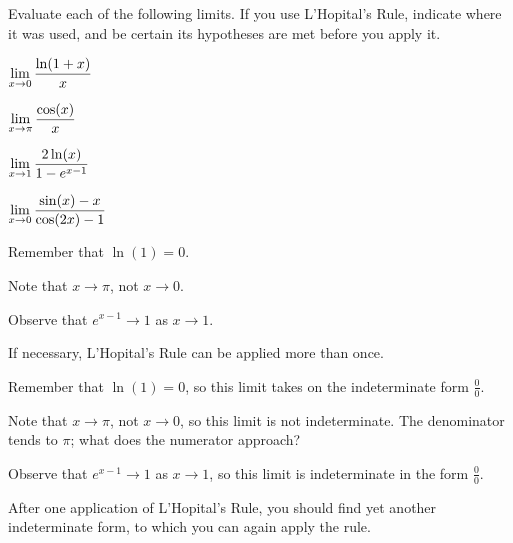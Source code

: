 \begin{activity} \label{A:3.7.1}  
Evaluate each of the following limits.  If you use L'Hopital's Rule, indicate where it was used, and be certain its hypotheses are met before you apply it.
\ba
\item $\displaystyle \lim_{x \to 0} \frac{\ln(1 + x)}{x}$
\item $\displaystyle \lim_{x \to \pi} \frac{\cos(x)}{x}$
\item $\displaystyle \lim_{x \to 1} \frac{2 \ln(x)}{1-e^{x-1}}$
\item $\displaystyle \lim_{x \to 0} \frac{\sin(x) - x}{\cos(2x)-1}$ 
\ea
\end{activity}
\begin{smallhint}
\ba
	\item Remember that $\ln(1) = 0$.
	\item Note that $x \to \pi$, not $x \to 0$.
	\item Observe that $e^{x-1} \to 1$ as $x \to 1$.
	\item If necessary, L'Hopital's Rule can be applied more than once.
\ea
\end{smallhint}
\begin{bighint}
\ba
	\item Remember that $\ln(1) = 0$, so this limit takes on the indeterminate form $\frac{0}{0}$.
	\item Note that $x \to \pi$, not $x \to 0$, so this limit is not indeterminate.  The denominator tends to $\pi$; what does the numerator approach?
	\item Observe that $e^{x-1} \to 1$ as $x \to 1$, so this limit is indeterminate in the form $\frac{0}{0}$.
	\item After one application of L'Hopital's Rule, you should find yet another indeterminate form, to which you can again apply the rule.
\ea
\end{bighint}
